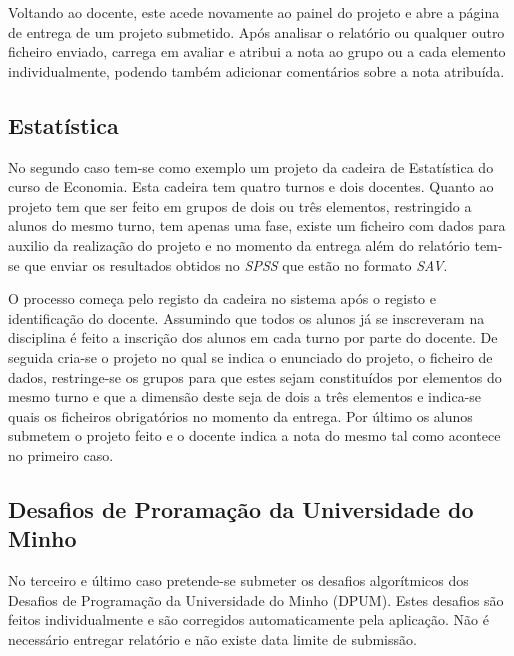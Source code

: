Voltando ao docente, este acede novamente ao painel do projeto e abre a página de entrega de um projeto submetido. Após analisar o relatório ou qualquer outro ficheiro enviado, carrega em avaliar e atribui a nota ao grupo ou a cada elemento individualmente, podendo também adicionar comentários sobre a nota atribuída.

\subsection{Estatística} %
\label{sub:estat_stica}


No segundo caso tem-se como exemplo um projeto da cadeira de Estatística do curso de Economia. Esta cadeira tem quatro turnos e dois docentes. Quanto ao projeto tem que ser feito em grupos de dois ou três elementos, restringido a alunos do mesmo turno, tem apenas uma fase, existe um ficheiro com dados para auxilio da realização do projeto e no momento da entrega além do relatório tem-se que enviar os resultados obtidos no \emph{SPSS} que estão no formato \emph{SAV}.

O processo começa pelo registo da cadeira no sistema após o registo e identificação do docente. Assumindo que todos os alunos já se inscreveram na disciplina é feito a inscrição dos alunos em cada turno por parte do docente. De seguida cria-se o projeto no qual se indica o enunciado do projeto, o ficheiro de dados, restringe-se os grupos para que estes sejam constituídos por elementos do mesmo turno e que a dimensão deste seja de dois a três elementos e indica-se quais os ficheiros obrigatórios no momento da entrega. Por último os alunos submetem o projeto feito e o docente indica a nota do mesmo tal como acontece no primeiro caso.

\subsection{Desafios de Proramação da Universidade do Minho} %
\label{sub:desafios_de_prorama_o_da_universidade_do_minho}


No terceiro e último caso pretende-se submeter os desafios algorítmicos dos Desafios de Programação da Universidade do Minho (DPUM). Estes desafios são feitos individualmente e são corregidos automaticamente pela aplicação. Não é necessário entregar relatório e não existe data limite de submissão.

